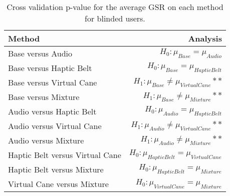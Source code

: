 
\begin{table}[!htb]
\centering
\caption{Cross validation p-value for the average GSR on each method for blinded users.}
\label{tab:lsd_gsr}
\begin{tabular}{lr}
\toprule
                         Method &                                       Analysis \\
\midrule
              Base versus Audio &               $H_0 : \mu_{Base} = \mu_{Audio}$ \\
        Base versus Haptic Belt &         $H_0 : \mu_{Base} = \mu_{Haptic Belt}$ \\
       Base versus Virtual Cane &    $H_1 : \mu_{Base} \ne \mu_{Virtual Cane}**$ \\
            Base versus Mixture &         $H_1 : \mu_{Base} \ne \mu_{Mixture}**$ \\
       Audio versus Haptic Belt &        $H_0 : \mu_{Audio} = \mu_{Haptic Belt}$ \\
      Audio versus Virtual Cane &   $H_1 : \mu_{Audio} \ne \mu_{Virtual Cane}**$ \\
           Audio versus Mixture &        $H_1 : \mu_{Audio} \ne \mu_{Mixture}**$ \\
Haptic Belt versus Virtual Cane & $H_0 : \mu_{Haptic Belt} = \mu_{Virtual Cane}$ \\
     Haptic Belt versus Mixture &      $H_0 : \mu_{Haptic Belt} = \mu_{Mixture}$ \\
    Virtual Cane versus Mixture &     $H_0 : \mu_{Virtual Cane} = \mu_{Mixture}$ \\
\bottomrule
\end{tabular}
\end{table}

